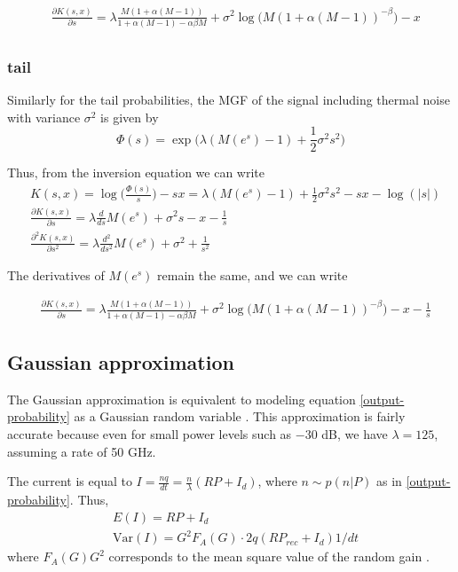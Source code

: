 \documentclass[a4paper]{article}
\begin{document}
\begin{align}
&\frac{\partial K(s,x)}{\partial s} = \lambda \frac{M(1 + \alpha (M-1))}{1 + \alpha(M-1) - \alpha\beta M} + \sigma^2\log\Big(M(1 + \alpha(M-1))^{-\beta}\Big) - x \\
\end{align}

\subsubsection{tail}
Similarly for the tail probabilities, the MGF of the signal including thermal noise with variance $\sigma^2$ is given by
\begin{equation}
\Phi (s) = \exp\Big(\lambda (M(e^s) - 1) + \frac{1}{2}\sigma^2s^2\Big)
\end{equation}

Thus, from the inversion equation we can write
\begin{align}
& K(s,x) = \log \Big(\frac{\Phi(s)}{s}\Big) - sx = \lambda (M(e^s) - 1) + \frac{1}{2}\sigma^2s^2 - sx - \log(|s|) \\
&\frac{\partial K(s,x)}{\partial s} = \lambda \frac{d}{ds}M(e^s) + \sigma^2s - x - \frac{1}{s} \\
&\frac{\partial^2 K(s,x)}{\partial s^2} = \lambda \frac{d^2}{ds^2}M(e^s) + \sigma^2 + \frac{1}{s^2} 
\end{align}

The derivatives of $M(e^s)$ remain the same, and we can write

\begin{align}
&\frac{\partial K(s,x)}{\partial s} = \lambda \frac{M(1 + \alpha (M-1))}{1 + \alpha(M-1) - \alpha\beta M} + \sigma^2\log\Big(M(1 + \alpha(M-1))^{-\beta}\Big) - x -\frac{1}{s}
\end{align}

\subsection{Gaussian approximation}
The Gaussian approximation is equivalent to modeling equation \eqref{output-probability} as a Gaussian random variable \cite{personick-comp-4methos}. This approximation is fairly accurate because even for small power levels such as $-30$ dB, we have $\lambda = 125$, assuming a rate of 50 GHz.

The current is equal to $I = \frac{nq}{dt} = \frac{n}{\lambda}(RP + I_d)$, where $n \sim p(n|P)$ as in \eqref{output-probability}. Thus, 
\begin{align}
& E(I) = RP + I_d \\
& \mathrm{Var}(I) = G^2F_A(G)\cdot 2q(RP_{rec} + I_d)1/dt
\end{align}
where $F_A(G)G^2$ corresponds to the mean square value of the random gain \cite{personick-comp-4methos}.
\end{document}
